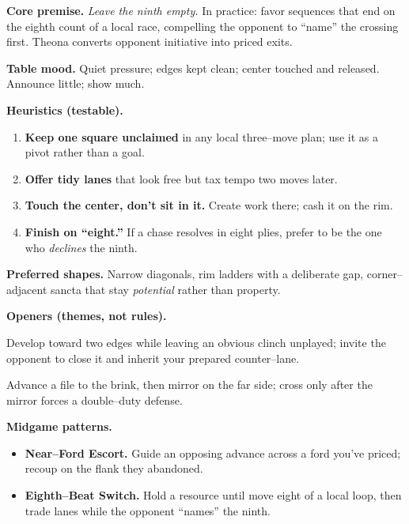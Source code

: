 \documentclass[11pt]{article}
\begin{document}
\begin{itemize}
\medskip
\noindent\textbf{Core premise.} \textit{Leave the ninth empty.} In practice: favor sequences that end on the eighth count of a local race, compelling the opponent to “name” the crossing first. Theona converts opponent initiative into priced exits.

\medskip
\noindent\textbf{Table mood.} Quiet pressure; edges kept clean; center touched and released. Announce little; show much.

\medskip
\noindent\textbf{Heuristics (testable).}
\begin{enumerate}\setlength\itemsep{0.25em}
  \item \textbf{Keep one square unclaimed} in any local three–move plan; use it as a pivot rather than a goal.
  \item \textbf{Offer tidy lanes} that look free but tax tempo two moves later.
  \item \textbf{Touch the center, don’t sit in it.} Create work there; cash it on the rim.
  \item \textbf{Finish on “eight.”} If a chase resolves in eight plies, prefer to be the one who \emph{declines} the ninth.
\end{enumerate}

\medskip
\noindent\textbf{Preferred shapes.} Narrow diagonals, rim ladders with a deliberate gap, corner–adjacent sancta that stay \emph{potential} rather than property.

\medskip
\noindent\textbf{Openers (themes, not rules).}
\begin{description}\setlength\itemsep{0.35em}
  \item[\textit{Empty Chair.}] Develop toward two edges while leaving an obvious clinch unplayed; invite the opponent to close it and inherit your prepared counter–lane.
  \item[\textit{Unpoured Cup.}] Advance a file to the brink, then mirror on the far side; cross only after the mirror forces a double–duty defense.
\end{description}

\medskip
\noindent\textbf{Midgame patterns.}
\begin{itemize}\setlength\itemsep{0.25em}
  \item \textbf{Near–Ford Escort.} Guide an opposing advance across a ford you’ve priced; recoup on the flank they abandoned.
  \item \textbf{Eighth–Beat Switch.} Hold a resource until move eight of a local loop, then trade lanes while the opponent “names” the ninth.
\end{itemize}


\end{itemize}
\end{document}
